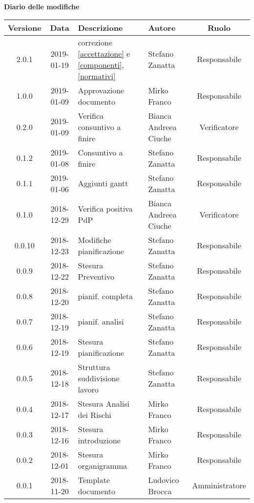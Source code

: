 	\begin{center}
		\textbf{Diario delle modifiche}
	\end{center}
	\begin{center}
		\begin{tabularx}{\textwidth}{|c|c|X|X|c|}
			\hline
			\textbf{Versione} & \textbf{Data} & \textbf{Descrizione} & \textbf{Autore} & \textbf{Ruolo} \\
			\hline
			2.0.1 & 2019-01-19 & correzione \ref{accettazione} e \ref{componenti},\ref{normativi} & Stefano Zanatta & Responsabile\\
			\hline
			1.0.0 & 2019-01-09 & Approvazione documento & Mirko Franco & Responsabile\\
			\hline
			0.2.0 & 2019-01-09 & Verifica consuntivo a finire & Bianca Andreea Ciuche& Verificatore\\
			\hline
			0.1.2 & 2019-01-08 & Consuntivo a finire & Stefano Zanatta & Responsabile\\
			\hline
			0.1.1 & 2019-01-06 & Aggiunti gantt & Stefano Zanatta & Responsabile\\
			\hline
			0.1.0 & 2018-12-29 & Verifica positiva PdP & Bianca Andreea Ciuche& Verificatore\\
			\hline
			0.0.10 & 2018-12-23 & Modifiche pianificazione & Stefano Zanatta & Responsabile\\
			\hline
			0.0.9 & 2018-12-22 & Stesura Preventivo & Stefano Zanatta & Responsabile\\
			\hline
			0.0.8 & 2018-12-20 & pianif. completa& Stefano Zanatta & Responsabile\\
			\hline
			0.0.7 & 2018-12-19 & pianif. analisi& Stefano Zanatta & Responsabile\\
			\hline
			0.0.6 & 2018-12-19 & Stesura pianificazione & Stefano Zanatta & Responsabile\\
			\hline
			0.0.5 & 2018-12-18 & Struttura suddivisione lavoro & Stefano Zanatta & Responsabile\\
			\hline
			0.0.4 & 2018-12-17 & Stesura Analisi dei Rischi & Mirko Franco & Responsabile\\
			\hline
			0.0.3 & 2018-12-16 & Stesura introduzione &Mirko Franco& Responsabile\\
			\hline
			0.0.2 & 2018-12-01 & Stesura organigramma &Mirko Franco& Responsabile\\
			\hline
			0.0.1 & 2018-11-20 & Template documento& Ludovico Brocca & Amministratore\\			
			\hline
			
		\end{tabularx}
	\end{center}
\newpage